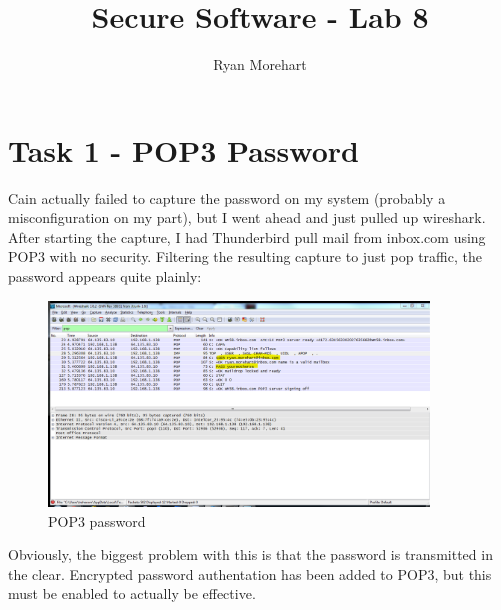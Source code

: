\documentclass{article}
\begin{document}
\pagestyle{fancy}

\title{Secure Software - Lab 8}
\author{Ryan Morehart}
\maketitle

\section{Task 1 - POP3 Password}
\par Cain actually failed to capture the password on my system (probably a misconfiguration on my part), but I went ahead and just pulled up wireshark. After starting the capture, I had Thunderbird pull mail from inbox.com using POP3 with no security. Filtering the resulting capture to just pop traffic, the password appears quite plainly:

\begin{figure}[h]
\centering
\includegraphics[width=0.9\textwidth, trim=0pt 300pt 200pt 50pt, clip]{pop3_password}
\caption{POP3 password}
\label{fig:pop}
\end{figure}

\par Obviously, the biggest problem with this is that the password is transmitted in the clear. Encrypted password authentation has been added to POP3, but this must be enabled to actually be effective.
\end{document}

